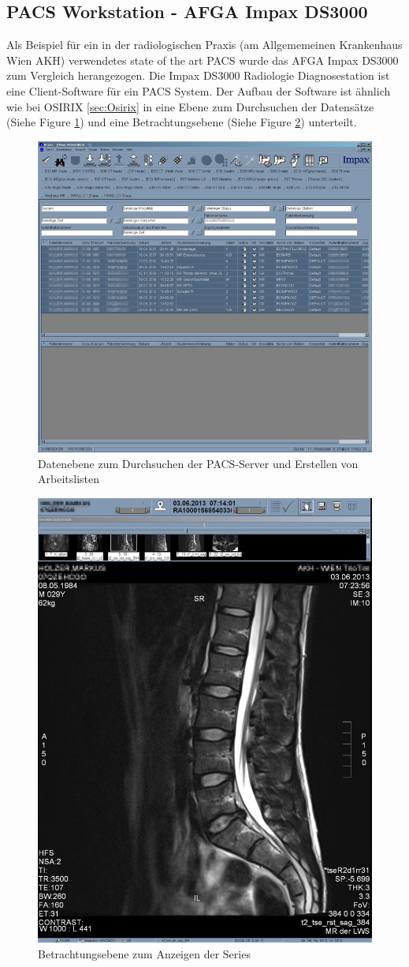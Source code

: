 \subsection{PACS Workstation - AFGA Impax DS3000}
\label{sec:PACS_Workstation}
Als Beispiel für ein in der radiologischen Praxis (am Allgememeinen Krankenhaus Wien AKH) verwendetes state of the art PACS wurde das AFGA Impax DS3000 zum Vergleich herangezogen. 
Die Impax DS3000 Radiologie Diagnosestation ist eine Client-Software für ein PACS System.
Der Aufbau der Software ist ähnlich wie bei OSIRIX \ref{sec:Osirix} in eine Ebene zum Durchsuchen der Datensätze (Siehe Figure \ref{fig:impacs_db_view}) und eine Betrachtungsebene (Siehe Figure \ref{fig:impacs_2d_view}) unterteilt.
%
\begin{figure}[t]
	\centering
	\includegraphics[width=0.7\linewidth]{img/c2_impacs_db_view.jpg}
	\caption{Datenebene zum Durchsuchen der PACS-Server und Erstellen von Arbeitslisten}
	\label{fig:impacs_db_view}
\end{figure}
%
\begin{figure}[t]
	\centering
	\includegraphics[width=0.7\linewidth]{img/c2_impacs_2d_view.jpg}
	\caption{Betrachtungsebene zum Anzeigen der Series}
	\label{fig:impacs_2d_view}
\end{figure}
